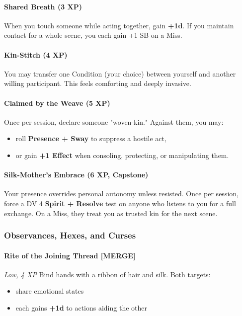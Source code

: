 \documentclass[11pt]{book}
\begin{document}
\paragraph{Shared Breath (3 XP)}
When you touch someone while acting together, gain \textbf{+1d}.  
If you maintain contact for a whole scene, you each gain +1 SB on a Miss.

\paragraph{Kin-Stitch (4 XP)}
You may transfer one Condition (your choice) between yourself and another willing participant.  
This feels comforting and deeply invasive.

\paragraph{Claimed by the Weave (5 XP)}
Once per session, declare someone "woven-kin."  
Against them, you may:
\begin{itemize}[leftmargin=*]
    \item roll \textbf{Presence + Sway} to suppress a hostile act,  
    \item or gain \textbf{+1 Effect} when consoling, protecting, or manipulating them.  
\end{itemize}

\paragraph{Silk-Mother's Embrace (6 XP, Capstone)}
Your presence overrides personal autonomy unless resisted.  
Once per session, force a DV 4 \textbf{Spirit + Resolve} test on anyone who listens to you for a full exchange.  
On a Miss, they treat you as trusted kin for the next scene.

\subsubsection{Observances, Hexes, and Curses}

\paragraph{Rite of the Joining Thread [MERGE]}
\emph{Low, 4 XP}  
Bind hands with a ribbon of hair and silk.  
Both targets:
\begin{itemize}[leftmargin=*]
    \item share emotional states  
    \item each gains \textbf{+1d} to actions aiding the other  
\end{itemize}
\end{document}
